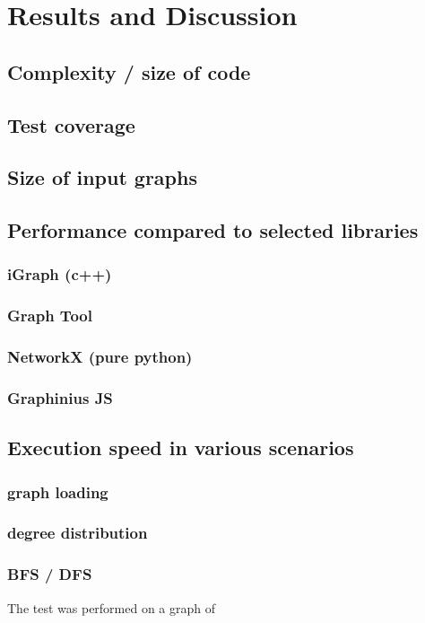 \chapter{Results and Discussion}
\label{ch:results_discussion}

\section{Complexity / size of code}
\label{sect:complexity}


\section{Test coverage}
\label{sect:test_coverage}


\section{Size of input graphs}
\label{sect:graphs_size}


\section{Performance compared to selected libraries}
\label{sect:perf_other_libs}

	\subsection{iGraph (c++)}
	\label{ssect:perf_igraph}
	
	\subsection{Graph Tool}
	\label{ssect:perf_graphtool}
	
	\subsection{NetworkX (pure python)}
	\label{ssect:perf_networkx}
	
	\subsection{Graphinius JS}
	\label{ssect:perf_graphinius}
	

\section{Execution speed in various scenarios}
\label{sect:performance}

	\subsection{graph loading}
	\label{ssect:perf_graph_loading}
	
	\subsection{degree distribution}
	\label{ssect:perf_deg_dist}
	
	\subsection{BFS / DFS}
	\label{ssect:perf_bfs_dfs}
	
	The test was performed on a graph of 
	